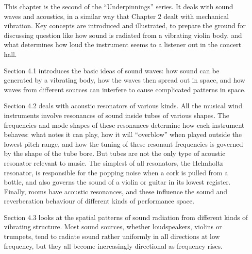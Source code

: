   This chapter is the second of the ``Underpinnings'' series. It deals with 
  sound waves and acoustics, in a similar way that Chapter 2 dealt with 
  mechanical vibration. Key concepts are introduced and illustrated, to prepare 
  the ground for discussing question like how sound is radiated from a 
  vibrating violin body, and what determines how loud the instrument seems to a 
  listener out in the concert hall. 

  Section 4.1 introduces the basic ideas of sound waves: how sound can be 
  generated by a vibrating body, how the waves then spread out in space, and 
  how waves from different sources can interfere to cause complicated patterns 
  in space. 

  Section 4.2 deals with acoustic resonators of various kinds. All the musical 
  wind instruments involve resonances of sound inside tubes of various shapes. 
  The frequencies and mode shapes of these resonances determine how each 
  instrument behaves: what notes it can play, how it will ``overblow'' when 
  played outside the lowest pitch range, and how the tuning of these resonant 
  frequencies is governed by the shape of the tube bore. But tubes are not the 
  only type of acoustic resonator relevant to music. The simplest of all 
  resonators, the Helmholtz resonator, is responsible for the popping noise 
  when a cork is pulled from a bottle, and also governs the sound of a violin 
  or guitar in its lowest register. Finally, rooms have acoustic resonances, 
  and these influence the sound and reverberation behaviour of different kinds 
  of performance space. 

  Section 4.3 looks at the spatial patterns of sound radiation from different 
  kinds of vibrating structure. Most sound sources, whether loudspeakers, 
  violins or trumpets, tend to radiate sound rather uniformly in all directions 
  at low frequency, but they all become increasingly directional as frequency 
  rises. 

